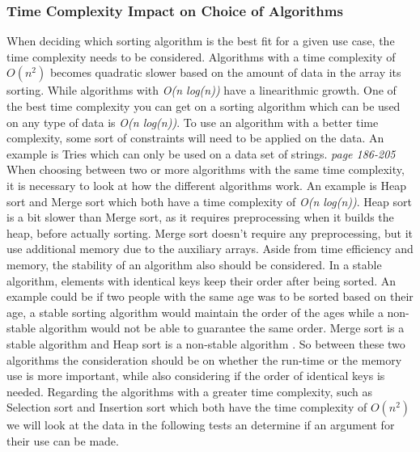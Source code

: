 \subsubsection*{Time Complexity Impact on Choice of Algorithms}
\label{sec:1.2.6}
When deciding which sorting algorithm is the best fit for a given use case, the time complexity needs to be considered. Algorithms with a time complexity of \(O(n^2)\) becomes quadratic slower based on the amount of data in the array its sorting. While algorithms with \emph{O(n log(n))} have a linearithmic growth. One of the best time complexity you can get on a sorting algorithm which can be used on any type of data is \emph{O(n log(n))}. To use an algorithm with a better time complexity, some sort of constraints will need to be applied on the data. An example is Tries which can only be used on a data set of strings. \cite{algo} \emph{page 186-205}
\newline
\newline
When choosing between two or more algorithms with the same time complexity, it is necessary to look at how the different algorithms work. An example is Heap sort and Merge sort which both have a time complexity of \emph{O(n log(n))}.
\newline
Heap sort is a bit slower than Merge sort, as it requires preprocessing when it builds the heap, before  actually sorting. Merge sort doesn't require any preprocessing, but it use additional memory due to the auxiliary arrays. Aside from time efficiency and memory, the stability of an algorithm also should be considered. In a stable algorithm, elements with identical keys keep their order after being sorted. An example could be if two people with the same age was to be sorted based on their age, a stable sorting algorithm would maintain the order of the ages while a non-stable algorithm would not be able to guarantee the same order. Merge sort is a stable algorithm and Heap sort is a non-stable algorithm \cite{sortingAlgo}.
So between these two algorithms the consideration should be on whether the run-time or the memory use is more important, while also considering if the order of identical keys is needed. 
\newline
Regarding the algorithms with a greater time complexity, such as Selection sort and Insertion sort which both have the time complexity of \(O(n^2)\) we will look at the data in the following tests an determine if an argument for their use can be made. 





